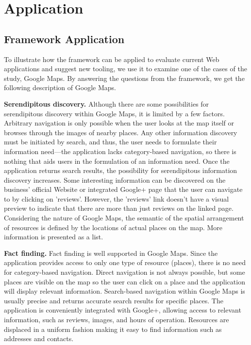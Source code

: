 \chapter{Application}
\label{chapter:application}

{\section{Framework Application}
To illustrate how the framework can be applied to evaluate current Web applications and suggest new tooling, we use it to examine one of the cases of the study, Google Maps. By answering the questions from the framework, we get the following description of Google Maps.

\textbf{Serendipitous discovery.} Although there are some possibilities for serendipitous discovery within Google Maps, it is limited by a few factors. Arbitrary navigation is only possible when the user looks at the map itself or browses through the images of nearby places. Any other information discovery must be initiated by search, and thus, the user needs to formulate their information need---the application lacks category-based navigation, so there is nothing that aids users in the formulation of an information need. Once the application returns search results, the possibility for serendipitous information discovery increases. Some interesting information can be discovered on the business' official Website or integrated Google+ page that the user can navigate to by clicking on 'reviews'. However, the 'reviews' link doesn't have a visual preview to indicate that there are more than just reviews on the linked page. Considering the nature of Google Maps, the semantic of the spatial arrangement of resources is defined by the locations of actual places on the map. More information is presented as a list. 

\textbf{Fact finding.} Fact finding is well supported in Google Maps. Since the application provides access to only one type of resource (places), there is no need for category-based navigation. Direct navigation is not always possible, but some places are visible on the map so the user can click on a place and the application will display relevant information. Search-based navigation within Google Maps is usually precise and returns accurate search results for specific places. The application is conveniently integrated with Google+, allowing access to relevant information, such as reviews, images, and hours of operation. Resources are displaced in a uniform fashion making it easy to find information such as addresses and contacts. 

}
